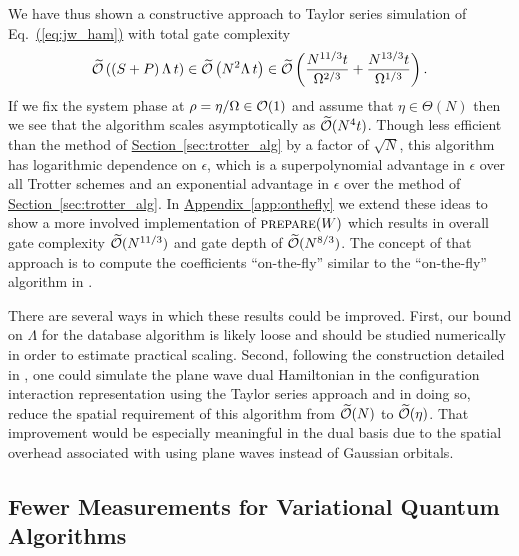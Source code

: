 \documentclass[superscriptaddress,aps,pra,nofootinbib,notitlepage,10pt,longbibliography]{revtex4-1}
\newcommand{\eq}[1]{Eq.~\hyperref[eq:#1]{(\ref*{eq:#1})}}
\renewcommand{\sec}[1]{\hyperref[sec:#1]{Section~\ref*{sec:#1}}}
\DeclareRobustCommand{\app}[1]{\hyperref[app:#1]{Appendix~\ref*{app:#1}}}
\begin{document}
We have thus shown a constructive approach to Taylor series simulation of \eq{jw_ham} with total gate complexity
\begin{equation}
\widetilde{\cal O}\left(\left(S + P\right) \Lambda \, t\right) \in \widetilde{\cal O}\left(N^2 \Lambda \, t\right)
%
\in \widetilde{\cal O}\left(\frac{N^{11/3} t}{\Omega^{2/3}} + \frac{N^{13/3} t}{\Omega^{1/3}}\right).
\end{equation}
If we fix the system phase at $\rho = \eta / \Omega \in {\cal O}(1)$ and assume that $\eta \in \Theta(N)$ then we see that the algorithm scales asymptotically as $\widetilde{\cal O}(N^4 t)$. Though less efficient than the method of \sec{trotter_alg} by a factor of $\sqrt{N}$, this algorithm has logarithmic dependence on $\epsilon$, which is a superpolynomial advantage in $\epsilon$ over all Trotter schemes and an exponential advantage in $\epsilon$ over the method of \sec{trotter_alg}. In \app{onthefly} we extend these ideas to show a more involved implementation of $\textsc{prepare}(W)$ which results in overall gate complexity $\widetilde{\cal O}(N^{11/3})$ and gate depth of $\widetilde{\cal O}(N^{8/3})$. The concept of that approach is to compute the coefficients ``on-the-fly'' similar to the ``on-the-fly'' algorithm in \cite{BabbushSparse1}.

There are several ways in which these results could be improved. First, our bound on $\Lambda$ for the database algorithm is likely loose and should be studied numerically in order to estimate practical scaling. Second, following the construction detailed in \cite{BabbushSparse2}, one could simulate the plane wave dual Hamiltonian in the configuration interaction representation using the Taylor series approach and in doing so, reduce the spatial requirement of this algorithm from $\widetilde{\cal O}(N)$ to $\widetilde{\cal O}(\eta)$. That improvement would be especially meaningful in the dual basis due to the spatial overhead associated with using plane waves instead of Gaussian orbitals.



\subsection{Fewer Measurements for Variational Quantum Algorithms}
\label{sec:measurement}
\end{document}
